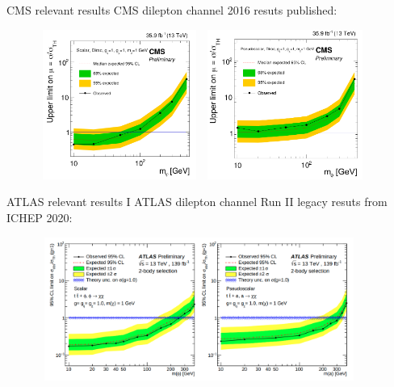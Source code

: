 \documentclass[8pt]{beamer}
\begin{document}
\begin{frame}{CMS relevant results}
\justifying
CMS dilepton channel 2016 resuts published: \vfill

\begin{figure}[htbp]
\centering
\begin{minipage}[b]{.5\textwidth}
\includegraphics[width=5.3cm, height=4.9cm]{figs/Juan_scalar_limits.png}
\end{minipage}\hfill
\begin{minipage}[b]{.5\textwidth}
\includegraphics[width=5.3cm, height=4.9cm]{figs/Juan_pseudo_limits.png}
\end{minipage}\hfill
\end{figure} \vfill
\end{frame}

\begin{frame}{ATLAS relevant results I}
\justifying
ATLAS dilepton channel Run II legacy resuts from ICHEP 2020: \vfill

 \begin{figure}[htbp]
\centering
\includegraphics[width=10.5cm, height=4.7cm]{figs/ATLASICHEP.png}
\end{figure} \vfill
\end{frame}
\end{document}
